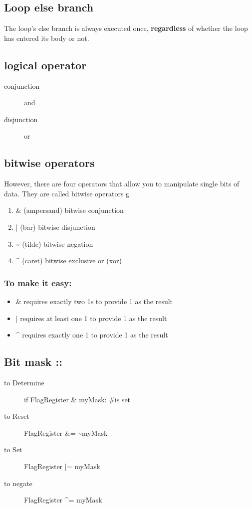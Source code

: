 \documentclass[11pt]{article}
\begin{document}
\subsection{Loop else branch}
\label{sec:org8ff06e2}
The loop’s else branch is always executed once, \textbf{regardless} of
whether the loop has entered its body or not.
\subsection{logical operator}
\label{sec:org066c9fe}
\begin{description}
\item[{conjunction}] and
\item[{disjunction}] or
\end{description}
\subsection{bitwise operators}
\label{sec:orga9bd22b}
However, there are four operators that allow you to manipulate single
bits of data. They are called bitwise operators
g
\begin{enumerate}
\item \&     (ampersand)  bitwise conjunction
\item |        (bar)              bitwise disjunction
\item \textasciitilde{}     (tilde)            bitwise negation
\item \^{}     (caret)           bitwise exclusive or (xor)
\end{enumerate}
\subsubsection{To make it easy:}
\label{sec:org5e0d62a}
\begin{itemize}
\item \& requires exactly two 1s to provide 1 as the result
\item | requires at least one 1 to provide 1 as the result
\item \^{} requires exactly one 1 to provide 1 as the result
\end{itemize}
\subsection{Bit mask ::}
\label{sec:org340c6b1}
\begin{description}
\item[{to Determine}] if FlagRegister \& myMask: \#is set
\item[{to Reset}] FlagRegister \&= \textasciitilde{}myMask
\item[{to Set}] FlagRegister |= myMask
\item[{to negate}] FlagRegister \^{}= myMask
\end{description}
\end{document}
